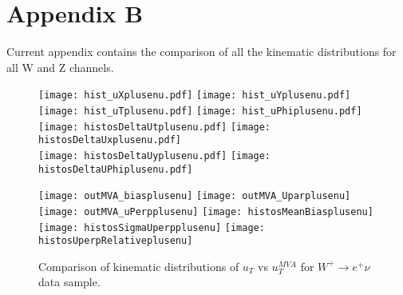 \chapter{Appendix B}
    Current appendix contains the comparison of all the kinematic distributions for all W and Z channels.
    
    \begin{figure}[h]
    	\centering
    	{\texttt{[image: hist\_uXplusenu.pdf]}}
    	{\texttt{[image: hist\_uYplusenu.pdf]}} \\
    	{\texttt{[image: hist\_uTplusenu.pdf]}}
    	{\texttt{[image: hist\_uPhiplusenu.pdf]}}\\
    	{\texttt{[image: histosDeltaUtplusenu.pdf]}}
    	{\texttt{[image: histosDeltaUxplusenu.pdf]}} \\
    	{\texttt{[image: histosDeltaUyplusenu.pdf]}}
    	{\texttt{[image: histosDeltaUPhiplusenu.pdf]}}\\
    	\label{fig:plusenu_data_distributions1}
    \end{figure}
    \begin{figure}[h]
    	\centering
    	{\texttt{[image: outMVA\_biasplusenu]}}
    	{\texttt{[image: outMVA\_Uparplusenu]}}
    	{\texttt{[image: outMVA\_uPerpplusenu]}}
    	{\texttt{[image: histosMeanBiasplusenu]}}
    	{\texttt{[image: histosSigmaUperpplusenu]}}
    	{\texttt{[image: histosUperpRelativeplusenu]}}
    	\caption{Comparison of kinematic distributions of $u_T$ vs $u_T^{MVA}$ for $W^+\rightarrow e^+\nu$ data sample.}
    	\label{fig:plusenu_data_distributions2}
    \end{figure}
    
